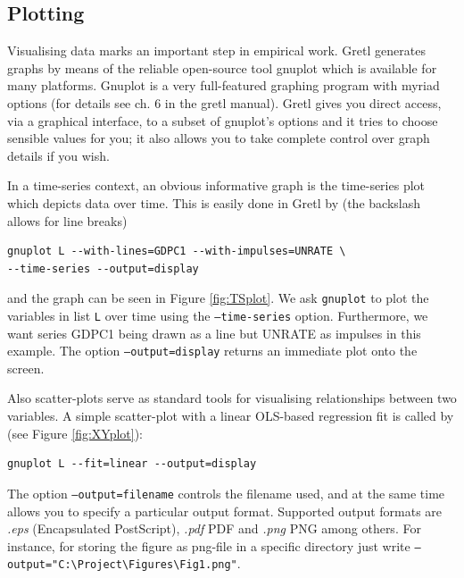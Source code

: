 \documentclass[11pt]{article}
\begin{document}
\subsection{Plotting}
Visualising data marks an important step in empirical work. Gretl generates graphs by means of the reliable open-source tool gnuplot which is available for many platforms. Gnuplot is a very full-featured graphing program with myriad options (for details see ch. 6 in the gretl manual). Gretl gives you direct access, via a graphical interface, to a subset of gnuplot’s options and it tries to choose sensible values for you; it also allows you to take complete control over graph details if you wish.

In a time-series context, an obvious informative graph is the time-series plot which depicts data over time. This is easily done in Gretl by (the backslash allows for line breaks)
\begin{Verbatim}[baselinestretch=0.75]
gnuplot L --with-lines=GDPC1 --with-impulses=UNRATE \
--time-series --output=display
\end{Verbatim}
and the graph can be seen in Figure \ref{fig:TSplot}. We ask \texttt{gnuplot} to plot the variables in list \texttt{L} over time using the \texttt{---time-series} option. Furthermore, we want series GDPC1 being drawn as a line but UNRATE as impulses in this example. The option \texttt{---output=display} returns an immediate plot onto the screen.

Also scatter-plots serve as standard tools for visualising relationships between two variables. A simple scatter-plot with a linear OLS-based regression fit is called by (see Figure \ref{fig:XYplot}):
\begin{verbatim}
gnuplot L --fit=linear --output=display
\end{verbatim}
The option \texttt{--output=filename} controls the filename used, and at the same time allows you to specify a particular output format. Supported output formats are \textit{.eps} (Encapsulated PostScript), \textit{.pdf} PDF and \textit{.png} PNG among others. For instance, for storing the figure as png-file in a specific directory just write \texttt{---output="C:\textbackslash{Project}\textbackslash{Figures}\textbackslash{Fig1}.png"}.
\end{document}
